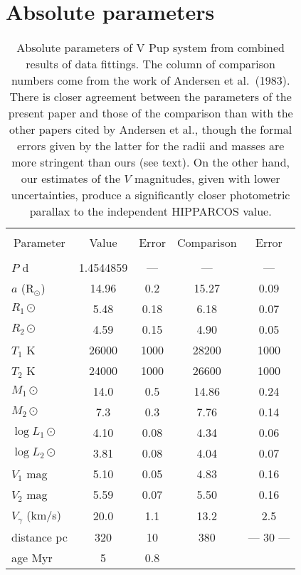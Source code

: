 \documentclass[useAMS,usenatbib]{mnras}                                                                           \usepackage[pdftex]{graphicx}
\begin{document}
\section{Absolute parameters} 
 \begin{table}
\begin{center}
\caption{Absolute parameters of V Pup system
from combined results of data fittings.  
The column of comparison numbers come from the work of Andersen et al.\ (1983).
There is closer agreement between the parameters of the present paper and those of 
the comparison than with the other papers cited by Andersen et al., though the formal errors
  given by the latter for the radii and masses are more stringent than ours (see text).
  On the other hand, our estimates of the  $V$ magnitudes,   
  given with lower uncertainties, produce a significantly closer photometric parallax to the
  independent HIPPARCOS value.
\label{tbl-7}} 
\begin{tabular}{lcccc}
   \hline  \\
\multicolumn{1}{c}{Parameter}  & \multicolumn{1}{c}{Value} & 
\multicolumn{1}{c}{Error} &\multicolumn{1}{c}{Comparison}&\multicolumn{1}{c}{Error} \\
\hline \\
$P$ d & 1.4544859 & ---   &   ---&  ---      \\
$a$ (R$_{\odot}$) & 14.96 & 0.2 & 15.27& 0.09  \\
$R_1 {\odot}$ & 5.48 & 0.18& 6.18&   0.07  \\
$R_2 {\odot}$ & 4.59 & 0.15& 4.90&   0.05 \\
$T_1$ K & 26000 & 1000& 28200&1000  \\
$T_2$ K & 24000 & 1000& 26600&1000  \\
$M_1 {\odot}$ & 14.0  &  0.5& 14.86& 0.24   \\
$M_2 {\odot}$ & 7.3 & 0.3 & 7.76& 0.14   \\
$\log L_1 {\odot}$ & 4.10 & 0.08 & 4.34& 0.06 \\
$\log L_2 {\odot}$ & 3.81 & 0.08 & 4.04& 0.07
 \\
$V_1$ mag   &  5.10 & 0.05& 4.83& 0.16  \\
$V_2$ mag   &  5.59 & 0.07& 5.50& 0.16   \\
$V_{\gamma}$ (km/s) & 20.0 & 1.1& 13.2& 2.5\\
distance pc & 320 & 10& 380& ---   30 ---     \\
age Myr &  5 & 0.8 & &\\
\hline
\end{tabular}
\end{center}
\end{table}
  
\end{document}
